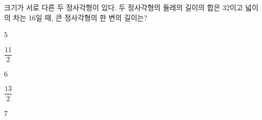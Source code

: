 크기가 서로 다른 두 정사각형이 있다. 두 정사각형의 둘레의 길이의 합은 32이고 넓이의 차는 16일 때, 큰 정사각형의 한 변의 길이는?
\begin{choicesii}{\rule[-3ex]{0pt}{8ex}$5$}{\rule[-3ex]{0pt}{8ex}$\dfrac{11}{2}$}{\rule[-3ex]{0pt}{8ex}$6$}{\rule[-3ex]{0pt}{8ex}$\dfrac{13}{2}$}{\rule[-3ex]{0pt}{8ex}$7$}\end{choicesii}
